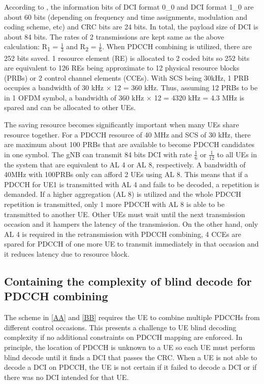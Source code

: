 \documentclass[conference]{IEEEtran}
\begin{document}
According to \cite{b8}, the information bits of DCI format 0\_0 and DCI format 1\_0 are about 60 bits (depending on frequency and time assignments, modulation and coding scheme, etc) and CRC bits are 24 bits. In total, the payload size of DCI is about 84 bits. The rates of 2 transmissions are kept same as the above calculation: R\textsubscript{1} = $\frac{1}{3}$ and R\textsubscript{2} = $\frac{1}{6}$. When PDCCH combining is utilized, there are 252 bits saved. 1 resource element (RE) is allocated to 2 coded bits so 252 bits are equivalent to 126 REs being approximate to 12 physical resource blocks (PRBs) or 2 control channel elements (CCEs). With SCS being 30kHz, 1 PRB occupies a bandwidth of 30 kHz $\times$ 12 = 360 kHz. Thus, assuming 12 PRBs to be in 1 OFDM symbol, a bandwidth of 360 kHz $\times$ 12 = 4320 kHz = 4.3 MHz is spared and can be allocated to other UEs. 

The saving resource becomes significantly important when many UEs share resource together. For a PDCCH resource of 40 MHz and SCS of 30 kHz, there are maximum about 100 PRBs that are available to become PDCCH candidates in one symbol. The gNB can transmit 84 bits DCI with rate $\frac{1}{6}$ or $\frac{1}{12}$ to all UEs in the system that are equivalent to AL 4 or AL 8, respectively. A bandwidth of 40MHz with 100PRBs only can afford 2 UEs using AL 8. This means that if a PDCCH for UE1 is transmitted with AL 4 and fails to be decoded, a repetition is demanded. If a higher aggregation (AL 8) is utilized and the whole PDCCH repetition is transmitted, only 1 more PDCCH with AL 8 is able to be transmitted to another UE. Other UEs must wait until the next transmission occasion and it hampers the latency of the transmission. On the other hand, only AL 4 is required in the retransmission with PDCCH combining, 4 CCEs are spared for PDCCH of one more UE to transmit immediately in that occasion and it reduces latency due to resource block.

\subsection{Containing the complexity of blind decode for PDCCH combining}\label{DD}

The scheme in \ref{AA} and \ref{BB} requires the UE to combine multiple PDCCHs from different control occasions. This presents a challenge to UE blind decoding complexity if no additional constraints on PDCCH mapping are enforced. In principle, the location of PDCCH is unknown to a UE so each UE must perform blind decode until it finds a DCI that passes the CRC. When a UE is not able to decode a DCI on PDCCH, the UE is not certain if it failed to decode a DCI or if there was no DCI intended for that UE. 
\end{document}
